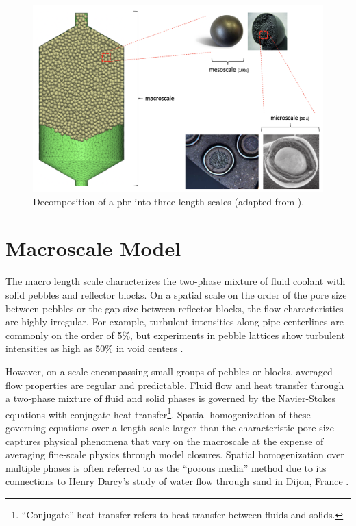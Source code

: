 \begin{figure}[!h]
\centering
\includegraphics[width=0.9\linewidth]{figs/multiscale_pbr.png}
\caption{Decomposition of a \gls{pbr} into three length scales (adapted from \cite{aufiero_2016,pebble_cut,pebble_uncut,triso_closeup,hales}).}
\label{fig:multiscale}
\end{figure}

\section{Macroscale Model}
\label{sec:macro_deriv}

The macro length scale characterizes the two-phase mixture of fluid coolant with solid pebbles and reflector blocks. On a spatial scale on the order of the pore size between pebbles or the gap size between reflector blocks, the flow characteristics are highly irregular. For example, turbulent intensities along pipe centerlines are commonly on the order of 5\%, but experiments in pebble lattices show turbulent intensities as high as 50\% in void centers \cite{mickley}. 

However, on a scale encompassing small groups of pebbles or blocks, averaged flow properties are regular and predictable. Fluid flow and heat transfer through a two-phase mixture of fluid and solid phases is governed by the Navier-Stokes equations with conjugate heat transfer\hspace{0.02cm}\footnote{``Conjugate'' heat transfer refers to heat transfer between fluids and solids.}. Spatial homogenization of these governing equations over a length scale larger than the characteristic pore size captures physical phenomena that vary on the macroscale at the expense of averaging fine-scale physics through model closures. Spatial homogenization over multiple phases is often referred to as the ``porous media'' method due to its connections to Henry Darcy's study of water flow through sand in Dijon, France \cite{darcy}.

